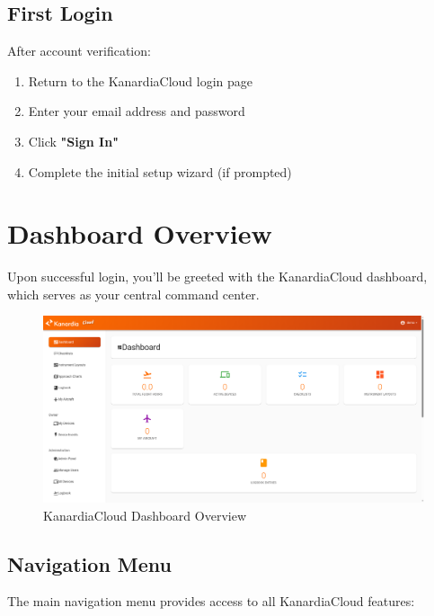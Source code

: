 \subsection{First Login}

After account verification:

\begin{enumerate}
    \item Return to the KanardiaCloud login page
    \item Enter your email address and password
    \item Click \textbf{"Sign In"}
    \item Complete the initial setup wizard (if prompted)
\end{enumerate}

\section{Dashboard Overview}

Upon successful login, you'll be greeted with the KanardiaCloud dashboard, which serves as your central command center.

\begin{figure}[H]
\centering
\includegraphics[width=\textwidth]{images/dashboard_overview.png}
\caption{KanardiaCloud Dashboard Overview}
\label{fig:dashboard_overview}
\end{figure}

\subsection{Navigation Menu}

The main navigation menu provides access to all KanardiaCloud features:

